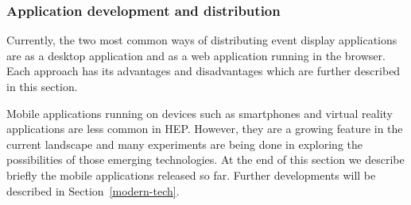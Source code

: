 \documentclass[12pt,a4paper]{article}
\begin{document}



\hypertarget{application-development}{%
\subsubsection{Application development and distribution}\label{application-development}}

Currently, the two most common ways of distributing event display applications are as a desktop application and as a web
application running in the browser. Each approach has its advantages and disadvantages which are further described in this section.

Mobile applications running on devices such as smartphones and virtual reality applications are less common in HEP. However, they are a growing feature in the current landscape and many experiments are being done in exploring the possibilities of those emerging technologies. At the end of this section we describe briefly the mobile applications released so far. Further developments will be described in
Section~\ref{modern-tech}.
\end{document}
